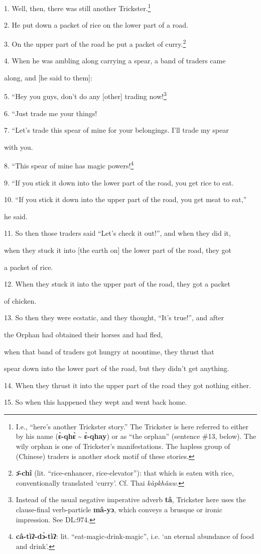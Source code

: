 \setcounter{footnote}{0}

1. Well, then, there was still another Trickster.\footnote{I.e., ``here's another Trickster story.'' The Trickster is here referred to either by his name (\textbf{ɛ̀-qhɛ̀} \textasciitilde{} \textbf{ɛ̀-qhay}) or as ``the orphan'' (sentence \#13, below). The wily orphan is one of Trickster's manifestations. The hapless group of (Chinese) traders is another stock motif of these stories.}

2. He put down a packet of rice on the lower part of a road.

3. On the upper part of the road he put a packet of curry.\footnote{\textbf{ɔ̄-chî} (lit. ``rice-enhancer, rice-elevator''): that which is eaten with rice, conventionally translated `curry'. Cf. Thai \textit{kàpkhâaw}.}

4. When he was ambling along carrying a spear, a band of traders came

along, and [he said to them]:

5. ``Hey you guys, don't do any [other] trading now!\footnote{Instead of the usual negative imperative adverb \textbf{tâ}, Trickster here uses the clause-final verb-particle \textbf{mâ-yɔ}, which conveys a brusque or ironic impression. See DL:974.}

6. ``Just trade me your things!

7. ``Let's trade this spear of mine for your belongings. I'll trade my
spear

with you.

8. ``This spear of mine has magic powers!\footnote{\textbf{câ-tìʔ-dɔ̀-tìʔ}: lit. ``eat-magic-drink-magic'', i.e. `an eternal abundance of food and drink'.}

9. ``If you stick it down into the lower part of the road, you get rice
to eat.

10. ``If you stick it down into the upper part of the road, you get meat
to eat,''

he said.

11. So then those traders said ``Let's check it out!'', and when they did it,


when they stuck it into [the earth on] the lower part of the road, they got


a packet of rice.

12. When they stuck it into the upper part of the road, they got a packet


of chicken.

13. So then they were ecstatic, and they thought, ``It's true!'', and after


the Orphan had obtained their horses and had fled,

when that band of traders got hungry at noontime, they thrust that

spear down into the lower part of the road, but they didn't get anything.

14. When they thrust it into the upper part of the road they got nothing either.

15. So when this happened they wept and went back home.

